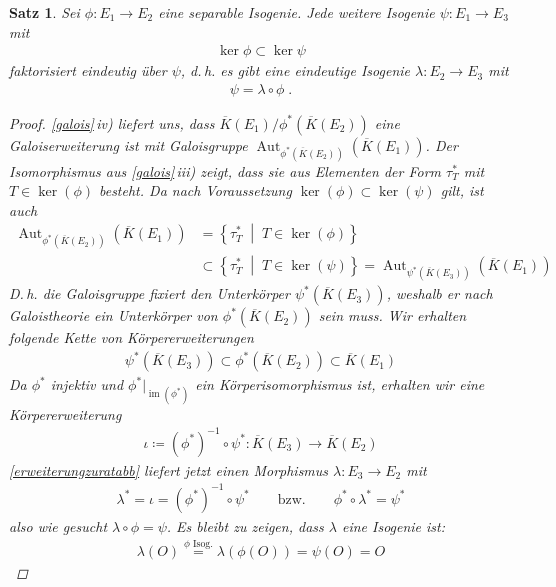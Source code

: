 \documentclass[english, german, parskip=half]{scrartcl}
\newtheorem{Satz}{Satz}[section]
\theoremstyle{definition}
\theoremstyle{remark}
\newcommand*{\algK}{\ensuremath{\overline K}} %
\newcommand*{\longto}{\longrightarrow}
\DeclareMathOperator{\Aut}{Aut}
\DeclareMathOperator{\im}{im} %
\begin{document}
\begin{Satz}
  Sei $\phi\colon E_1\to E_2$ eine separable Isogenie.
  Jede weitere Isogenie $\psi\colon E_1\to E_3$ mit
  \begin{gather*}
    \ker\phi \subset \ker\psi
  \end{gather*}
  faktorisiert eindeutig über $\psi$, d.\,h. es gibt eine eindeutige
  Isogenie $\lambda\colon E_2\to E_3$ mit
  \begin{gather*}
    \psi = \lambda\circ\phi\;.
  \end{gather*}
  \begin{proof}
    \autoref{galois}\,iv) liefert uns, dass
    $\algK(E_1)/\phi^*(\algK(E_2))$ eine Galoiserweiterung ist mit
    Galoisgruppe $\Aut_{\phi^*(\algK(E_2))}(\algK(E_1))$.
    Der Isomorphismus aus \autoref{galois}\,iii) zeigt, dass sie aus
    Elementen der Form $\tau_T^*$ mit $T\in\ker(\phi)$ besteht.
    Da nach Voraussetzung $\ker(\phi)\subset\ker(\psi)$ gilt,
    ist auch
    \begin{align*}
      \Aut_{\phi^*(\algK(E_2))}(\algK(E_1))
      &= \left\{ \tau_T^* \;\middle|\; T\in\ker(\phi) \right\} \\
      &\subset
      \left\{ \tau_T^* \;\middle|\; T\in\ker(\psi) \right\}
      = \Aut_{\psi^*(\algK(E_3))}(\algK(E_1))
    \end{align*}
    D.\,h. die Galoisgruppe fixiert den Unterkörper
    $\psi^*(\algK(E_3))$, weshalb er nach Galoistheorie ein
    Unterkörper von $\phi^*(\algK(E_2))$ sein muss.
    Wir erhalten folgende Kette von Körpererweiterungen
    \begin{gather*}
      \psi^*(\algK(E_3)) 
      \subset \phi^*(\algK(E_2)) 
      \subset \algK(E_1)
    \end{gather*}
    Da $\phi^*$ injektiv und $\phi^*|_{\im(\phi^*)}$ ein
    Körperisomorphismus ist, erhalten wir eine Körpererweiterung
    \begin{gather*}
      \iota\coloneqq 
      (\phi^*)^{-1} \circ \psi^*
      \colon \algK(E_3) \longto \algK(E_2)
    \end{gather*}
    \autoref{erweiterungzuratabb} liefert jetzt einen Morphismus
    $\lambda\colon E_3\to E_2$ mit
    \begin{gather*}
      \lambda^* = \iota = (\phi^*)^{-1} \circ \psi^*
      \qquad\text{bzw.}\qquad
      \phi^*\circ\lambda^* = \psi^*
    \end{gather*}
    also wie gesucht $\lambda\circ\phi = \psi$.
    Es bleibt zu zeigen, dass $\lambda$ eine Isogenie ist:
    \begin{gather*}
      \lambda(O) 
      \overset{\text{$\phi$ Isog.}}{=} \lambda(\phi(O))
      = \psi(O) 
      = O
    \end{gather*}
  \end{proof}
\end{Satz}
\end{document}
